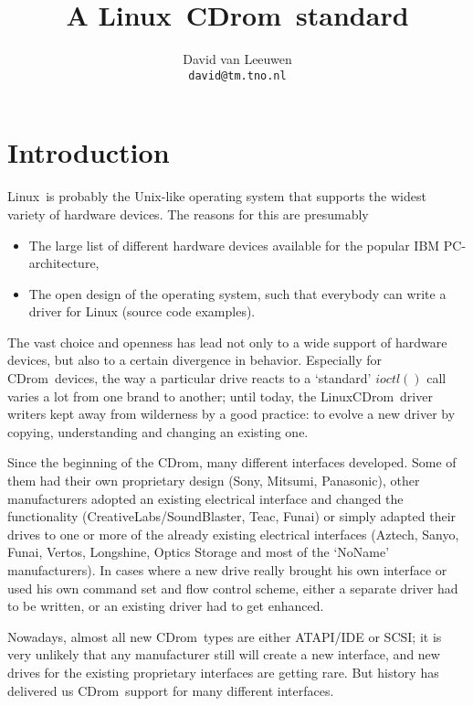 \documentclass{article}
\def\linux{{\sc Linux}}
\def\cdrom{{\sc CDrom}}
\begin{document}
\title{A \linux\ \cdrom\ standard}
\author{David van Leeuwen\\{\normalsize\tt david@tm.tno.nl}}

\maketitle

\section{Introduction}

\linux\ is probably the Unix-like operating system that supports the widest
variety of hardware devices. The reasons for this are presumably
\begin{itemize}
\item The large list of different hardware devices available for the popular
IBM PC-architecture,
\item The open design of the operating system, such that everybody can
write a driver for Linux (source code examples).
\end{itemize}
The vast choice and openness has lead not only to a wide support of
hardware devices, but also to a certain divergence in behavior. Especially
for \cdrom\ devices, the way a particular drive reacts to a `standard'
$ioctl()$ call varies a lot from one brand to another; until today, the
\linux \cdrom\ driver writers kept away from wilderness by a good practice:
to evolve a new driver by copying, understanding and changing an existing
one.

Since the beginning of the \cdrom, many different interfaces developed.
Some of them had their own proprietary design (Sony, Mitsumi, Panasonic),
other manufacturers adopted an existing electrical interface and changed
the functionality (CreativeLabs/SoundBlaster, Teac, Funai) or simply adapted
their drives to one or more of the already existing electrical interfaces
(Aztech, Sanyo, Funai, Vertos, Longshine, Optics Storage and most of the
`NoName' manufacturers).
In cases where a new drive really brought his own interface or used his
own command set and flow control scheme, either a separate driver had to
be written, or an existing driver had to get enhanced.

Nowadays, almost all new \cdrom\ types are either ATAPI/IDE or SCSI;
it is very unlikely that any manufacturer still will create a new
interface, and new drives for the existing proprietary interfaces are
getting rare.
But history has delivered us \cdrom\ support for many different interfaces.
\end{document}
